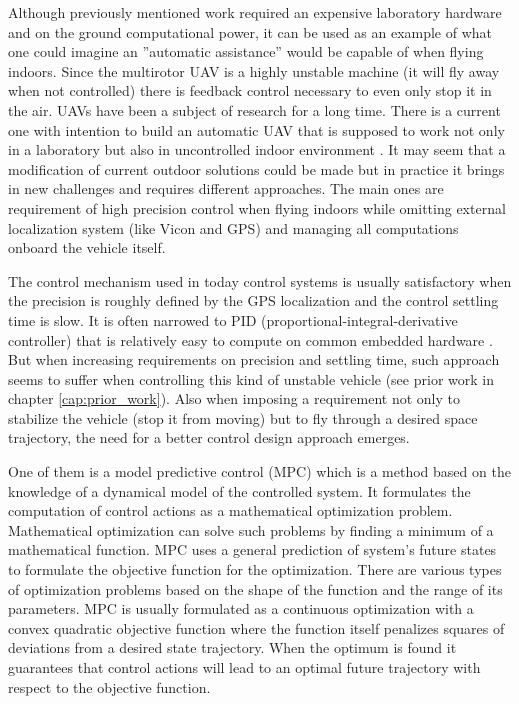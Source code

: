 Although previously mentioned work required an expensive laboratory hardware and on the ground computational power, it can be used as an example of what one could imagine an ''automatic assistance'' would be capable of when flying indoors. Since the multirotor UAV is a highly unstable machine (it will fly away when not controlled) there is feedback control necessary to even only stop it in the air. UAVs have been a subject of research for a long time. There is a current one with intention to build an automatic UAV that is supposed to work not only in a laboratory but also in uncontrolled indoor environment \citep{alexis2014rmpc}. It may seem that a modification of current outdoor solutions could be made but in practice it brings in new challenges and requires different approaches. The main ones are requirement of high precision control when flying indoors while omitting external localization system (like Vicon and GPS) and managing all computations onboard the vehicle itself.

The control mechanism used in today control systems is usually satisfactory when the precision is roughly defined by the GPS localization and the control settling time is slow. It is often narrowed to PID (proportional-integral-derivative controller) that is relatively easy to compute on common embedded hardware \cite{pixhawk, ardupilot}. But when increasing requirements on precision and settling time, such approach seems to suffer when controlling this kind of unstable vehicle (see prior work in chapter \ref{cap:prior_work}). Also when imposing a requirement not only to stabilize the vehicle (stop it   from moving) but to fly through a desired space trajectory, the need for a better control design approach emerges.

One of them is a model predictive control (MPC) which is a method based on the knowledge of a dynamical model of the controlled system. It formulates the computation of control actions as a mathematical optimization problem. Mathematical optimization can solve such problems by finding a minimum of a mathematical function. MPC uses a general prediction of system's future states to formulate the objective function for the optimization. There are various types of optimization problems based on the shape of the function and the range of its parameters. MPC is usually formulated as a continuous optimization with a convex quadratic objective function where the function itself penalizes squares of deviations from a desired state trajectory. When the optimum is found it guarantees that control actions will lead to an optimal future trajectory with respect to the objective function.

